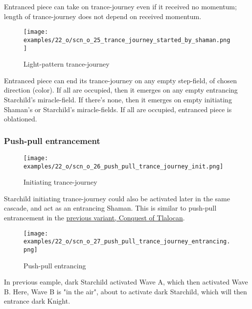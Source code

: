 Entranced piece can take on trance-journey even if it received no momentum;
length of trance-journey does not depend on received momentum.

\clearpage %

\vspace*{-2.1\baselineskip}
\noindent
\begin{figure}[!h]
\texttt{[image: examples/22\_o/scn\_o\_25\_trance\_journey\_started\_by\_shaman.png]}
\caption{Light-pattern trance-journey}
\label{fig:scn_o_25_trance_journey_started_by_shaman}
\end{figure}

Entranced piece can end its trance-journey on any empty step-field, of chosen
direction (color). If all are occupied, then it emerges on any empty entrancing
Starchild's miracle-field. If there's none, then it emerges on empty initiating
Shaman's or Starchild's miracle-fields. If all are occupied, entranced piece is
oblationed.

\clearpage %

\subsubsection*{Push-pull entrancement}
\label{sec:One/Starchild/Trance-journey/Push-pull entrancement}

\noindent
\begin{minipage}{\textwidth}
\begin{wrapfigure}[7]{l}{0.4\textwidth}
\centering
\texttt{[image: examples/22\_o/scn\_o\_26\_push\_pull\_trance\_journey\_init.png]}
\caption{Initiating trance-journey}
\label{fig:scn_o_26_push_pull_trance_journey_init}
\end{wrapfigure}
Starchild initiating trance-journey could also be activated later in the same cascade,
and act as an entrancing Shaman. This is similar to push-pull entrancement in the
\hyperref[fig:star/scn_cot_33_push_pull_entrancement_start]{previous variant, Conquest of Tlalocan}.
\end{minipage}

\vspace*{4.9\baselineskip}
\noindent
\begin{minipage}{\textwidth}
\begin{wrapfigure}[10]{l}{0.4\textwidth}
\centering
\texttt{[image: examples/22\_o/scn\_o\_27\_push\_pull\_trance\_journey\_entrancing.png]}
\caption{Push-pull entrancing}
\label{fig:scn_o_27_push_pull_trance_journey_entrancing}
\end{wrapfigure}
In previous eample, dark Starchild activated Wave A, which then activated Wave B.
Here, Wave B is "in the air", about to activate dark Starchild, which will then
entrance dark Knight.
\end{minipage}

